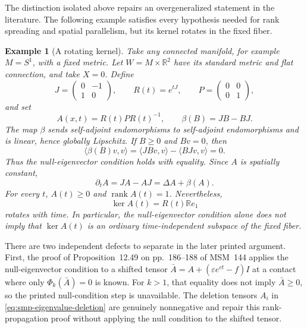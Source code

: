 \documentclass[10pt]{coll-l}
\newtheorem{example}[theorem]{Example}
\theoremstyle{definition}
\theoremstyle{remark}
\numberwithin{section}{chapter}
\numberwithin{equation}{chapter}
\begin{document}
The distinction isolated above repairs an overgeneralized statement in the
literature.  The following example satisfies every hypothesis needed for
rank spreading and spatial parallelism, but its kernel rotates in the fixed
fiber.

\begin{example}[A rotating kernel]
\label{ex:smp-rotating-kernel}
Take any connected manifold, for example $M=S^1$, with a fixed metric.
Let $W=M\times\mathbb R^2$ have its standard metric and flat connection,
and take $X=0$.  Define
\[
 J=\begin{pmatrix}0&-1\\1&0\end{pmatrix},
 \qquad
 R(t)=e^{tJ},
 \qquad
 P=\begin{pmatrix}0&0\\0&1\end{pmatrix},
\]
and set
\begin{equation}
 A(x,t)=R(t)PR(t)^{-1},
 \qquad
 \beta(B)=JB-BJ.                                         \label{eq:smp-rotating-example}
\end{equation}
The map $\beta$ sends self-adjoint endomorphisms to self-adjoint
endomorphisms and is linear, hence globally Lipschitz.  If $B\geq0$ and
$Bv=0$, then
\[
 \langle\beta(B)v,v\rangle
 =\langle JBv,v\rangle-\langle BJv,v\rangle=0.
\]
Thus the null-eigenvector condition holds with equality.  Since $A$ is
spatially constant,
\[
 \partial_tA=JA-AJ=\Delta A+\beta(A).
\]
For every $t$, $A(t)\geq0$ and $\operatorname{rank}A(t)=1$.  Nevertheless,
\begin{equation}
                  \ker A(t)=R(t)\mathbb Re_1             \label{eq:smp-rotating-kernel}
\end{equation}
rotates with time.  In particular, the null-eigenvector condition alone
does not imply that $\ker A(t)$ is an ordinary time-independent subspace of
the fixed fiber.
\end{example}

There are two independent defects to separate in the later printed
argument.  First, the proof of Proposition~12.49 on pp.~186--188 of
MSM~144 applies the null-eigenvector condition to a shifted tensor
$\bar A=A+(\varepsilon e^{ct}-f)I$ at a contact where only
$\Phi_k(\bar A)=0$ is known.  For $k>1$, that equality does not imply
$\bar A\geq0$, so the printed null-condition step is unavailable.  The
deletion tensors $A_i$ in
\eqref{eq:smp-eigenvalue-deletion} are genuinely nonnegative and repair
this rank-propagation proof without applying the null condition to the
shifted tensor.
\end{document}

